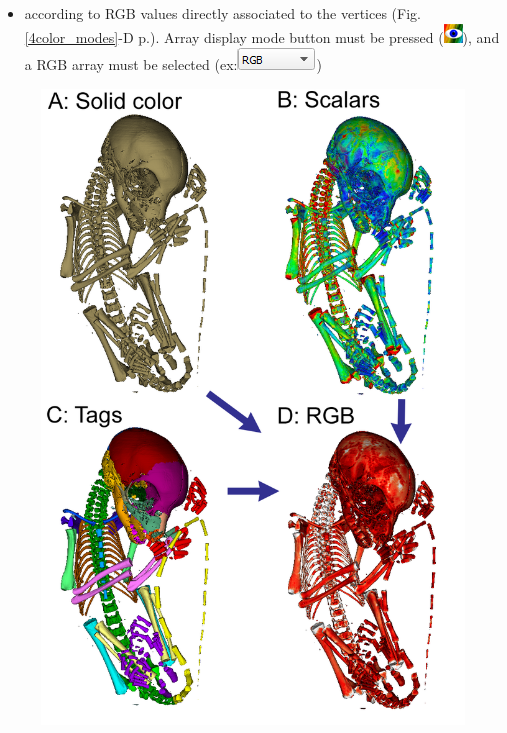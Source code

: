 \begin{itemize}
\item	according to RGB values directly associated to the vertices (Fig. \ref{4color_modes}-D p.\pageref{4color_modes}). Array display mode button must be pressed (\includegraphics[scale=0.7]{images/04/show_color_scale.png}), and a RGB array must be selected (ex:\includegraphics[scale=0.5]{images/04/scalarcombo_rgb.png}) 
\end{itemize}

\begin{figure}
  \centering
  \includegraphics[scale=0.39]{images/04/4color_modes.png} 

\end{figure}
